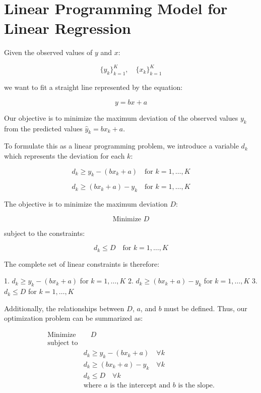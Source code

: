 \documentclass{article}
\begin{document}
\section*{Linear Programming Model for Linear Regression}

Given the observed values of \( y \) and \( x \):

\[
\{y_k\}_{k=1}^{K}, \quad \{x_k\}_{k=1}^{K}
\]

we want to fit a straight line represented by the equation:

\[
y = bx + a
\]

Our objective is to minimize the maximum deviation of the observed values \( y_k \) from the predicted values \( \hat{y}_k = bx_k + a \). 

To formulate this as a linear programming problem, we introduce a variable \( d_k \) which represents the deviation for each \( k \):

\[
d_k \geq y_k - (bx_k + a) \quad \text{for } k = 1, \ldots, K
\]

\[
d_k \geq (bx_k + a) - y_k \quad \text{for } k = 1, \ldots, K
\]

The objective is to minimize the maximum deviation \( D \):

\[
\text{Minimize } D
\]

subject to the constraints:

\[
d_k \leq D \quad \text{for } k = 1, \ldots, K
\]

The complete set of linear constraints is therefore:

1. \( d_k \geq y_k - (bx_k + a) \) for \( k = 1, \ldots, K \)
2. \( d_k \geq (bx_k + a) - y_k \) for \( k = 1, \ldots, K \)
3. \( d_k \leq D \) for \( k = 1, \ldots, K \)

Additionally, the relationships between \( D \), \( a \), and \( b \) must be defined. Thus, our optimization problem can be summarized as:

\[
\begin{align*}
\text{Minimize} & \quad D \\
\text{subject to} & \\
& d_k \geq y_k - (bx_k + a) \quad \forall k \\
& d_k \geq (bx_k + a) - y_k \quad \forall k \\
& d_k \leq D \quad \forall k \\
& \text{where } a \text{ is the intercept and } b \text{ is the slope.}
\end{align*}
\]
\end{document}
